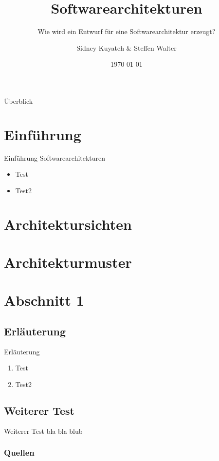 \documentclass{beamer}
\title{Softwarearchitekturen}
\subtitle{Wie wird ein Entwurf für eine Softwarearchitektur erzeugt?}
\author{Sidney Kuyateh \& Steffen Walter}
\institute{Duale Hochschule Baden-Württemberg}
\date{\today}
\begin{document}
	\maketitle
	\begin{frame}{Überblick}
		\tableofcontents
	\end{frame}
		\section{Einführung}
		\begin{frame}{Einführung Softwarearchitekturen}
			\begin{itemize}
				\item Test
				\item Test2\cite[ S. 12]{prinzip}
			\end{itemize}
	\end{frame}
		
		\section{Architektursichten}
		\section{Architekturmuster}
	
	\section{Abschnitt 1}
		\subsection{Erläuterung}
			\begin{frame}{Erläuterung}
				\begin{enumerate}
					\item Test
					\item Test2
				\end{enumerate}
			\end{frame}
		\subsection{Weiterer Test}
			\begin{frame}{Weiterer Test}
				bla bla blub
			\end{frame}
	\begin{frame}[allowframebreaks]
		\frametitle{Quellen}
		
		
	\end{frame}
\end{document}
